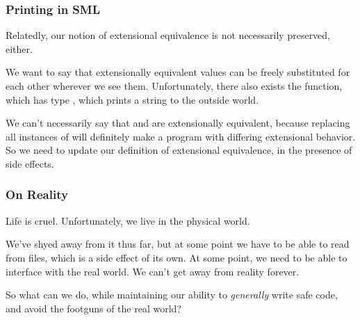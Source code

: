 \documentclass[aspectratio=169, handout]{beamer}
\begin{document}
\begin{frame}[fragile]
  \frametitle{Printing in SML}

  Relatedly, our notion of extensional equivalence is not necessarily preserved,
  either.

  \pause
  \vspace{\fill}

  We want to say that extensionally equivalent values can be freely substituted
  for each other wherever we see them. Unfortunately, there also exists
  the  function, which has type , which
  prints a string to the outside world.

  \pause
  \vspace{\fill}

  We can't necessarily say that  and \code{()} are extensionally
  equivalent, because replacing all instances of \code{()} will definitely make
  a program with differing extensional behavior. So we need to update our
  definition of extensional equivalence, in the presence of side effects.
\end{frame}


\begin{frame}[fragile]
  \frametitle{On Reality}

  Life is cruel. Unfortunately, we live in the physical world.

  \pause
  \vspace{\fill}

  We've shyed away from it thus far, but at some point we have to be able to read
  from files, which is a side effect of its own. At some point, we need to be able
  to interface with the real world. We can't get away from reality forever.

  \pause
  \vspace{\fill}

  So what can we do, while maintaining our ability to \textit{generally} write
  safe code, and avoid the footguns of the real world?
\end{frame}
\end{document}
